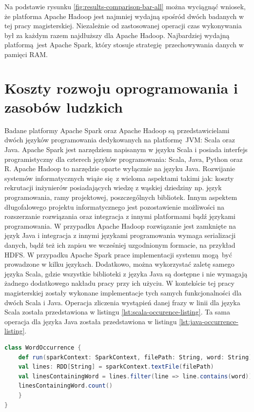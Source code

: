 Na podstawie rysunku \ref{fig:results-comparison-bar-all} można wyciągnąć wniosek, że platforma Apache Hadoop jest najmniej wydajną spośród dwóch badanych w tej pracy magisterskiej. Niezależnie od zastosowanej operacji czas wykonywania był za każdym razem najdłuższy dla Apache Hadoop. Najbardziej wydajną platformą jest Apache Spark, który stosuje strategię przechowywania danych w pamięci RAM.    
\section{Koszty rozwoju oprogramowania i zasobów ludzkich}\label{development_human_resources}
Badane platformy Apache Spark oraz Apache Hadoop są przedstawicielami dwóch języków programowania dedykowanych na platformę JVM: Scala oraz Java. Apache Spark jest narzędziem napisanym w języku Scala i posiada interfejs programistyczny dla czterech języków programowania: Scala, Java, Python oraz R. Apache Hadoop to narzędzie oparte wyłącznie na języku Java. Rozwijanie systemów informatycznych wiąże się z wieloma aspektami takimi jak: koszty rekrutacji inżynierów posiadających wiedzę z wąskiej dziedziny np. język programowania, ramy projektowej, poszczególnych bibliotek. Innym aspektem długofalowego projektu informatycznego jest pozostawienie możliwości na rozszerzanie rozwiązania oraz integracja z innymi platformami bądź językami programowania. W przypadku Apache Hadoop rozwiązanie jest zamknięte na język Java i integracja z innymi językami programowania wymaga serializacji danych, bądź też ich zapisu we wcześniej uzgodnionym formacie, na przykład HDFS. W przypadku Apache Spark prace implementacji systemu mogą być prowadzone w kilku językach. Dodatkowo, można wykorzystać zaletę samego języka Scala, gdzie wszystkie biblioteki z języka Java są dostępne i nie wymagają żadnego dodatkowego nakładu pracy przy ich użyciu. W kontekście tej pracy magisterskiej zostały wykonane implementacje tych samych funkcjonalności dla dwóch Scala i Java. Operacja zliczenia wystąpień danej frazy w linii dla języka Scala została przedstawiona w listingu \ref{lst:scala-occurence-listing}. Ta sama operacja dla języka Java została przedstawiona w listingu \ref{lst:java-occurrence-listing}.
\begin{lstlisting}[language=scala, caption={Operacja zliczania wystąpień danej frazy w linii dla języka Scala na platformie Apache Spark},captionpos=b, label={lst:scala-occurence-listing}]
class WordOccurrence {
	def run(sparkContext: SparkContext, filePath: String, word: String) = {
	val lines: RDD[String] = sparkContext.textFile(filePath)
	val linesContainingWord = lines.filter(line => line.contains(word))
	linesContainingWord.count()
	}
}
\end{lstlisting}
